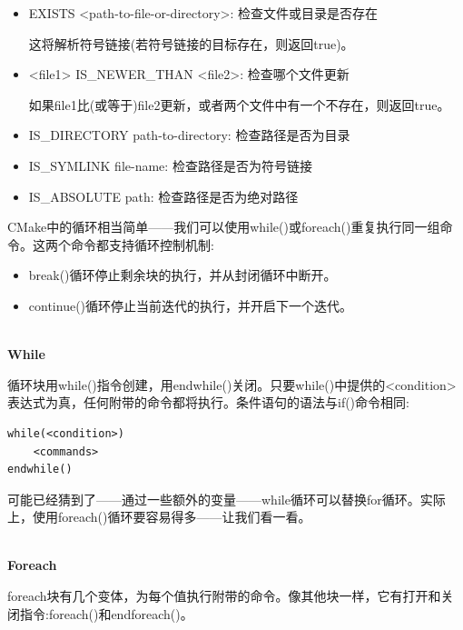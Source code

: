 \begin{itemize}
\item 
EXISTS <path-to-file-or-directory>: 检查文件或目录是否存在

这将解析符号链接(若符号链接的目标存在，则返回true)。

\item 
<file1> IS\_NEWER\_THAN <file2>: 检查哪个文件更新

如果file1比(或等于)file2更新，或者两个文件中有一个不存在，则返回true。

\item 
IS\_DIRECTORY path-to-directory: 检查路径是否为目录

\item 
IS\_SYMLINK file-name: 检查路径是否为符号链接

\item 
IS\_ABSOLUTE path: 检查路径是否为绝对路径
\end{itemize}


CMake中的循环相当简单——我们可以使用while()或foreach()重复执行同一组命令。这两个命令都支持循环控制机制:

\begin{itemize}
\item 
break()循环停止剩余块的执行，并从封闭循环中断开。

\item 
continue()循环停止当前迭代的执行，并开启下一个迭代。
\end{itemize}

\hspace*{\fill} \\ %
\noindent
\textbf{While}

循环块用while()指令创建，用endwhile()关闭。只要while()中提供的<condition>表达式为真，任何附带的命令都将执行。条件语句的语法与if()命令相同:

\begin{lstlisting}[style=styleCMake]
while(<condition>)
	<commands>
endwhile()
\end{lstlisting}

可能已经猜到了——通过一些额外的变量——while循环可以替换for循环。实际上，使用foreach()循环要容易得多——让我们看一看。

\hspace*{\fill} \\ %
\noindent
\textbf{Foreach}

foreach块有几个变体，为每个值执行附带的命令。像其他块一样，它有打开和关闭指令:foreach()和endforeach()。

